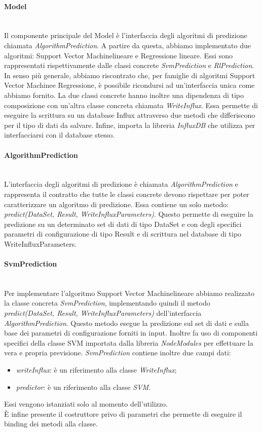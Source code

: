 \paragraph{Model} \mbox{}\\ [1mm]
Il componente principale del Model è l'interfaccia degli algoritmi di predizione chiamata \textit{AlgorithmPrediction}. A partire da questa, abbiamo implementato due algoritmi: Support Vector Machine\glosp lineare e Regressione lineare\glo. Essi sono rappresentati rispettivamente dalle classi concrete \textit{SvmPrediction} e \textit{RlPrediction}. In senso più generale, abbiamo riscontrato che, per famiglie di algoritmi Support Vector Machine\glosp e Regressione\glo, è possibile ricondursi ad un'interfaccia unica come abbiamo fornito.
La due classi concrete hanno inoltre una dipendenza di tipo composizione con un'altra classe concreta chiamata \textit{WriteInflux}. Essa permette di eseguire la scrittura su un database Influx attraverso due metodi che differiscono per il tipo di dati da salvare. Infine, importa la libreria \textit{InfluxDB} che utilizza per interfacciarsi con il database stesso.
\paragraph*{AlgorithmPrediction} \mbox{}\\ [1mm]
L'interfaccia degli algoritmi di predizione è chiamata \textit{AlgorithmPrediction} e rappresenta il contratto che tutte le classi concrete devono rispettare per poter caratterizzare un algoritmo di predizione. Essa contiene un solo metodo: \textit{predict(DataSet, Result, WriteInfluxParameters)}. Questo permette di eseguire la predizione su un determinato set di dati di tipo DataSet e con degli specifici parametri di configurazione di tipo Result e di scrittura nel database di tipo WriteInfluxParameters.
\paragraph*{SvmPrediction} \mbox{}\\ [1mm]
Per implementare l'algoritmo Support Vector Machine\glosp lineare abbiamo realizzato la classe concreta \textit{SvmPrediction}, implementando quindi il metodo \textit{predict(DataSet, Result, WriteInfluxParameters)} dell'interfaccia \textit{AlgorithmPrediction}.
Questo metodo esegue la predizione sul set di dati e sulla base dei parametri di configurazione forniti in input. Inoltre fa uso di componenti specifici della classe SVM importata dalla libreria \textit{NodeModules} per effettuare la vera e propria previsione. \textit{SvmPrediction} contiene inoltre due campi dati:
\begin{itemize}
	\item \textit{writeInflux}: è un riferimento alla classe \textit{WriteInflux};
	\item \textit{predictor}: è un riferimento alla classe \textit{SVM}.
\end{itemize}
Essi vengono istanziati solo al momento dell'utilizzo. \\
È infine presente il costruttore privo di parametri che permette di eseguire il binding dei metodi alla classe.
